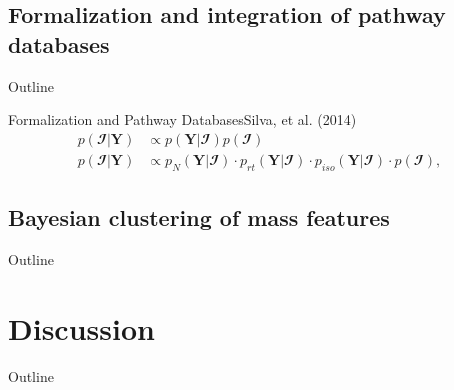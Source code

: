 \documentclass[xcolor=dvipsnames]{beamer}
\begin{document}
\subsection{Formalization and integration of pathway databases}
\begin{frame}{Outline}
	\vspace{-10.5pt}
	\tableofcontents[currentsection,subsectionstyle=show/shaded/hide]
\end{frame}

\begin{frame}{Formalization and Pathway Databases}{Silva, et al. (2014)}
	\begin{align*}
	p( \mathbfcal{I}|\textbf{Y}) & \propto p(\textbf{Y}| \mathbfcal{I}) p( \mathbfcal{I}) \\
	p(\mathbfcal{I}|\textbf{Y}) & \propto p_N(\textbf{Y}|\mathbfcal{I}) \cdot p_{rt}(\textbf{Y}|\mathbfcal{I}) \cdot p_{iso}(\textbf{Y}|\mathbfcal{I}) \cdot p( \mathbfcal{I}),
	\end{align*}
\end{frame}

\subsection{Bayesian clustering of mass features}
\begin{frame}{Outline}
	\vspace{-10.5pt}
	\tableofcontents[currentsection,subsectionstyle=show/shaded/hide]
\end{frame}

\section{Discussion}

\begin{frame}{Outline}
	\vspace{-10.5pt}
	\tableofcontents[currentsection,subsectionstyle=hide]
\end{frame}
\end{document}
